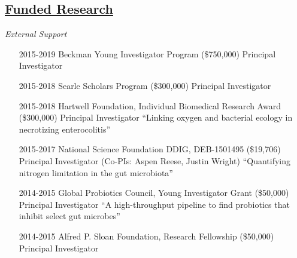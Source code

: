 \documentclass[overlapped,line,11pt]{res}
\begin{document}
\begin{resume}
\section{\underline{\sc Funded Research}} 
\vspace{.1in}
\emph{External Support}
\vspace{.1in}

\begin{itemize}[leftmargin=2cm, style=sameline]

\item[2015-2019] Beckman Young Investigator Program (\$750,000) \newline Principal Investigator 

\item[2015-2018] Searle Scholars Program (\$300,000) \newline Principal Investigator 
  
\item[2015-2018] Hartwell Foundation, Individual Biomedical Research Award (\$300,000) \newline Principal Investigator 
  \newline ``Linking oxygen and bacterial ecology in necrotizing enterocolitis''

\item[2015-2017] National Science Foundation DDIG, DEB-1501495 (\$19,706) \newline Principal Investigator (Co-PIs: Aspen Reese, Justin Wright) 
  \newline ``Quantifying nitrogen limitation in the gut microbiota''

\item[2014-2015] Global Probiotics Council, Young Investigator Grant (\$50,000) \newline Principal Investigator 
  \newline ``A high-throughput pipeline to find probiotics that
  inhibit select gut microbes''

\item[2014-2015] Alfred P. Sloan Foundation, Research Fellowship (\$50,000) \newline Principal Investigator 

\end{itemize}


\end{resume}
\end{document}
